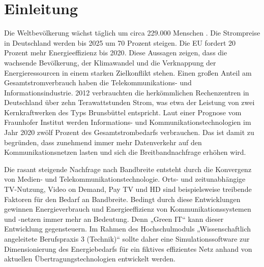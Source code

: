 \section{Einleitung}
Die Welt\-bevölkerung wächst täglich um circa 229.000 Menschen \cite{statista:zuwachs}. Die Strompreise in Deutschland werden bis 2025 um 70 Prozent steigen\cite{welt}. Die EU fordert 20 Prozent mehr Energieeffizienz bis 2020\cite{bmwi:energiepolitik}. Diese Aussagen zeigen, dass die wachsende Bevölkerung, der Klimawandel und die Verknappung der Energieressourcen in einem starken Zielkonflikt stehen. 
Einen großen Anteil am Gesamtstromverbrauch haben die Telekommunikations- und Informationsindustrie. 2012 verbrauchten die herkömmlichen Rechenzentren in Deutschland über zehn Terawattstunden Strom, was etwa der Leistung von zwei Kernkraftwerken des Typs Brunsbüttel entspricht. Laut einer Prognose vom Fraunhofer Institut werden Informations- und Kommunikationstechnologien im Jahr 2020 zwölf Prozent des Gesamtstrombedarfs verbrauchen\cite{fraunhofer:energiebedarf}. Das ist damit zu begründen, dass zunehmend immer mehr Datenverkehr auf den Kommunikationsnetzen lasten und sich die Breitbandnachfrage erhöhen wird. 


Die rasant steigende Nachfrage nach Bandbreite entsteht durch die Konvergenz von Medien- und Telekommunikationstechnologie. Orts- und zeitunabhängige TV-Nutzung, Video on Demand, Pay TV und HD sind beispielsweise treibende Faktoren für den Bedarf an Bandbreite. 
Bedingt durch diese Entwicklungen gewinnen Energieverbrauch und Energieeffizienz von Kommunikationssystemen und -netzen immer mehr an Bedeutung. Denn „Green IT“ kann dieser Entwicklung gegensteuern. Im Rahmen des Hochschulmoduls „Wissenschaftlich angeleitete Berufspraxis 3 (Technik)“ sollte daher eine Simulationssoftware zur Dimensionierung des Energiebedarfs für ein fiktives effizientes Netz anhand von aktuellen Übertragungstechnologien entwickelt werden. 

